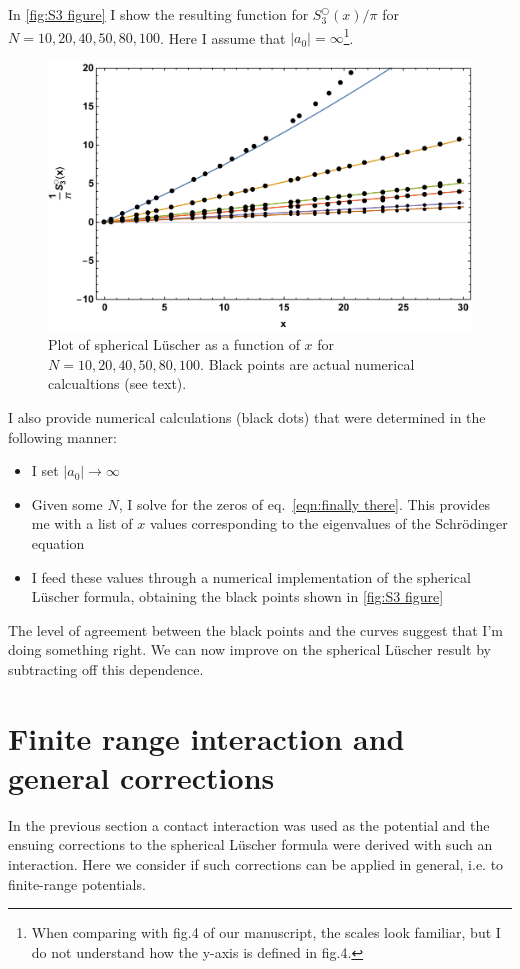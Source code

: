 \documentclass[11pt]{article}
\begin{document}
In \autoref{fig:S3 figure} I show the resulting function for $S^\bigcirc_3(x)/\pi$ for $N=10,20,40,50,80,100$.  Here I assume that $|a_0|=\infty$\footnote{When comparing with fig.4 of our manuscript, the scales look familiar, but I do not understand how the y-axis is defined in fig.4.}.
\begin{figure}
\center
\includegraphics[width=.8\textwidth]{figs/S3_figure.pdf}
\caption{Plot of spherical L\"uscher as a function of $x$ for $N=10,20,40,50,80,100$.  Black points are actual numerical calcualtions (see text).\label{fig:S3 figure}}
\end{figure}
I also provide numerical calculations (black dots) that were determined in the following manner:
\begin{itemize}
\item I set $|a_0|\to\infty$
\item Given some $N$, I solve for the zeros of eq.~\eqref{eqn:finally there}.  This provides me with a list of $x$ values corresponding to the eigenvalues of the Schr\"odinger equation
\item I feed these values through a numerical implementation of the spherical L\"uscher formula, obtaining the black points shown in \autoref{fig:S3 figure}
\end{itemize}
The level of agreement between the black points and the curves suggest that I'm doing something right.  We can now improve on the spherical L\"uscher result by subtracting off this dependence.

\section{Finite range interaction and general corrections}
In the previous section a contact interaction was used as the potential and the ensuing corrections to the spherical L\"uscher formula were derived with such an interaction.  Here we consider if such corrections can be applied in general, i.e. to finite-range potentials.
\end{document}
